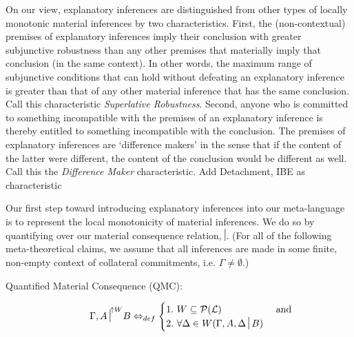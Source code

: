 \documentclass{article}
\newcommand{\nc}{\turnstile{s}{w}{}{}{n}}
\begin{document}
On our view, explanatory inferences are distinguished from other types of locally monotonic material inferences by two characteristics. First, the (non-contextual) premises of explanatory inferences imply their conclusion with greater subjunctive robustness than any other premises that materially imply that conclusion (in the same context). In other words, the maximum range of subjunctive conditions that can hold without defeating an explanatory inference is greater than that of any other material inference that has the same conclusion. Call this characteristic \textit{Superlative Robustness}. \color{red}Second, anyone who is committed to something incompatible with the premises of an explanatory inference is thereby entitled to something incompatible with the conclusion. The premises of explanatory inferences are `difference makers' in the sense that if the content of the latter were different, the content of the conclusion would be different as well.  Call this the \textit{Difference Maker} characteristic. Add Detachment, IBE as characteristic \color{black}

Our first step toward introducing explanatory inferences into our meta-language is to represent the local monotonicity of material inferences. We do so by quantifying over our material consequence relation, $ \nc $. (For all of the following meta-theoretical claims, we assume that all inferences are made in some finite, non-empty context of collateral commitments, i.e. $ \Gamma \neq \emptyset $.)

	\begin{description}
		\item[Quantified Material Consequence (QMC):]
		\begin{equation}
				      {\Gamma, A \nc}^{\uparrow W} B \Leftrightarrow_{def} 
				      \begin{cases}\nonumber
				        1.\,\, W\subseteq\mathcal{P}(\mathcal{L}) & $ and $ \\
						2.\,\, \forall\Delta\in W(\Gamma, A,  \Delta \nc B ) 
						\end{cases}
		\end{equation}
	
	\end{description}  
	
\end{document}
